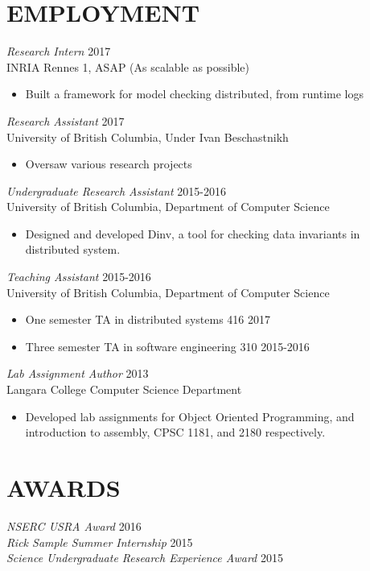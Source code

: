\documentclass[line,margin]{res}
\begin{document}
\begin{resume}
\section{EMPLOYMENT} 
{\sl Research Intern} \hfill 2017\\
    INRIA Rennes 1, ASAP (As scalable as possible)
\begin{itemize} \itemsep -2pt
        \item Built a framework for model checking distributed, from runtime logs
    \end{itemize}
{\sl Research Assistant} \hfill 2017\\
    University of British Columbia, Under Ivan Beschastnikh
\begin{itemize} \itemsep -2pt
        \item Oversaw various research projects
    \end{itemize}
{\sl Undergraduate Research Assistant} \hfill 2015-2016\\
	University of British Columbia, Department of Computer Science
\begin{itemize} \itemsep -2pt
        \item Designed and developed Dinv, a tool for checking data invariants in distributed system.
    \end{itemize}
{\sl Teaching Assistant} \hfill 2015-2016\\
	University of British Columbia, Department of Computer Science
\begin{itemize} \itemsep -2pt
        \item One semester TA in distributed systems 416 \hfill 2017
		\item Three semester TA in software engineering 310 \hfill 2015-2016\\
	\end{itemize}
{\sl Lab Assignment Author} \hfill 2013\\
	Langara College Computer Science Department
	\begin{itemize} \itemsep -2pt
			\item Developed lab assignments for Object Oriented Programming, and introduction to assembly, CPSC 1181, and 2180 respectively.
	\end{itemize}
    

\section{AWARDS}
{\sl NSERC USRA Award} \hfill 2016\\
{\sl Rick Sample Summer Internship} \hfill 2015\\
{\sl Science Undergraduate Research Experience Award} \hfill 2015\\



\end{resume}
\end{document}
